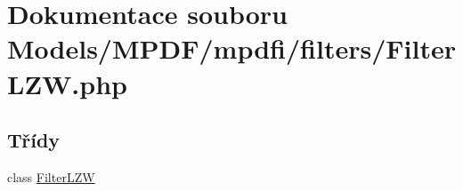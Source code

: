 \hypertarget{_filter_l_z_w_8php}{\section{Dokumentace souboru Models/\-M\-P\-D\-F/mpdfi/filters/\-Filter\-L\-Z\-W.php}
\label{_filter_l_z_w_8php}
}
\subsection*{Třídy}
\begin{DoxyCompactItemize}
\item 
class \hyperlink{class_filter_l_z_w}{Filter\-L\-Z\-W}
\end{DoxyCompactItemize}
